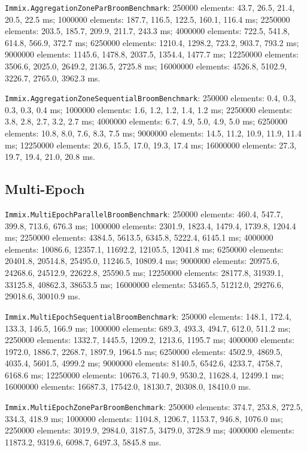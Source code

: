 \documentclass[
  english,   %
  bibtex,    %
]{kththesis}
\begin{document}
\texttt{Immix.AggregationZoneParBroomBenchmark}: 250000 elements: 43.7, 26.5,
21.4, 20.5, 22.5 ms; 1000000 elements: 187.7, 116.5, 122.5, 160.1, 116.4 ms;
2250000 elements: 203.5, 185.7, 209.9, 211.7, 243.3 ms; 4000000 elements:
722.5, 541.8, 614.8, 566.9, 372.7 ms; 6250000 elements: 1210.4, 1298.2,
723.2, 903.7, 793.2 ms; 9000000 elements: 1145.6, 1478.8, 2037.5, 1354.4,
1477.7 ms; 12250000 elements: 3506.6, 2025.0, 2649.2, 2136.5, 2725.8 ms;
16000000 elements: 4526.8, 5102.9, 3226.7, 2765.0, 3962.3 ms.

\texttt{Immix.AggregationZoneSequentialBroomBenchmark}: 250000 elements: 0.4,
0.3, 0.3, 0.3, 0.4 ms; 1000000 elements: 1.6, 1.2, 1.2, 1.4, 1.2 ms; 2250000
elements: 3.8, 2.8, 2.7, 3.2, 2.7 ms; 4000000 elements: 6.7, 4.9, 5.0, 4.9,
5.0 ms; 6250000 elements: 10.8, 8.0, 7.6, 8.3, 7.5 ms; 9000000 elements: 14.5,
11.2, 10.9, 11.9, 11.4 ms; 12250000 elements: 20.6, 15.5, 17.0, 19.3, 17.4 ms;
16000000 elements: 27.3, 19.7, 19.4, 21.0, 20.8 ms.

\subsection{Multi-Epoch}

\texttt{Immix.MultiEpochParallelBroomBenchmark}: 250000 elements: 460.4, 547.7,
399.8, 713.6, 676.3 ms; 1000000 elements: 2301.9, 1823.4, 1479.4, 1739.8,
1204.4 ms; 2250000 elements: 4384.5, 5613.5, 6345.8, 5222.4, 6145.1 ms;
4000000 elements: 10086.6, 12357.1, 11692.2, 12105.5, 12041.8 ms; 6250000
elements: 20401.8, 20514.8, 25495.0, 11246.5, 10809.4 ms; 9000000 elements:
20975.6, 24268.6, 24512.9, 22622.8, 25590.5 ms; 12250000 elements: 28177.8,
31939.1, 33125.8, 40862.3, 38653.5 ms; 16000000 elements: 53465.5, 51212.0,
29276.6, 29018.6, 30010.9 ms.

\texttt{Immix.MultiEpochSequentialBroomBenchmark}: 250000 elements: 148.1, 172.4,
133.3, 146.5, 166.9 ms; 1000000 elements: 689.3, 493.3, 494.7, 612.0, 511.2
ms; 2250000 elements: 1332.7, 1445.5, 1209.2, 1213.6, 1195.7 ms; 4000000
elements: 1972.0, 1886.7, 2268.7, 1897.9, 1964.5 ms; 6250000 elements: 4502.9,
4869.5, 4035.4, 5601.5, 4999.2 ms; 9000000 elements: 8140.5, 6542.6, 4233.7,
4758.7, 6168.6 ms; 12250000 elements: 10676.3, 7140.9, 9530.2, 11628.4,
12499.1 ms; 16000000 elements: 16687.3, 17542.0, 18130.7, 20308.0, 18410.0 ms.

\texttt{Immix.MultiEpochZoneParBroomBenchmark}: 250000 elements: 374.7, 253.8,
272.5, 334.3, 418.9 ms; 1000000 elements: 1104.8, 1206.7, 1153.7, 946.8,
1076.0 ms; 2250000 elements: 3019.9, 2984.0, 3187.5, 3479.0, 3728.9 ms;
4000000 elements: 11873.2, 9319.6, 6098.7, 6497.3, 5845.8 ms.
\end{document}
